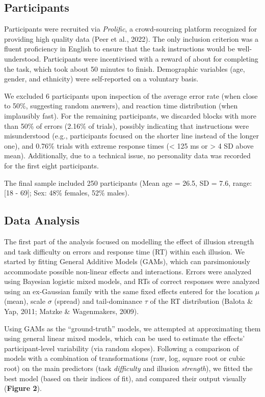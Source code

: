\documentclass[
  man,floatsintext]{apa6}
\begin{document}
\hypertarget{participants}{%
\subsection{Participants}\label{participants}}

Participants were recruited via \emph{Prolific}, a crowd-sourcing platform recognized for providing high quality data (Peer et al., 2022). The only inclusion criterion was a fluent proficiency in English to ensure that the task instructions would be well-understood. Participants were incentivised with a reward of about  for completing the task, which took about 50 minutes to finish. Demographic variables (age, gender, and ethnicity) were self-reported on a voluntary basis.

We excluded 6 participants upon inspection of the average error rate (when close to 50\%, suggesting random answers), and reaction time distribution (when implausibly fast). For the remaining participants, we discarded blocks with more than 50\% of errors (2.16\% of trials), possibly indicating that instructions were misunderstood (e.g., participants focused on the shorter line instead of the longer one), and 0.76\% trials with extreme response times (\textless{} 125 ms or \textgreater{} 4 SD above mean). Additionally, due to a technical issue, no personality data was recorded for the first eight participants.

The final sample included 250 participants (Mean age = 26.5, SD = 7.6, range: {[}18 - 69{]}; Sex: 48\% females, 52\% males).

\hypertarget{data-analysis}{%
\subsection{Data Analysis}\label{data-analysis}}

The first part of the analysis focused on modelling the effect of illusion strength and task difficulty on errors and response time (RT) within each illusion. We started by fitting General Additive Models (GAMs), which can parsimoniously accommodate possible non-linear effects and interactions. Errors were analyzed using Bayesian logistic mixed models, and RTs of correct responses were analyzed using an ex-Gaussian family with the same fixed effects entered for the location \(\mu\) (mean), scale \(\sigma\) (spread) and tail-dominance \(\tau\) of the RT distribution (Balota \& Yap, 2011; Matzke \& Wagenmakers, 2009).

Using GAMs as the ``ground-truth'' models, we attempted at approximating them using general linear mixed models, which can be used to estimate the effects' participant-level variability (via random slopes). Following a comparison of models with a combination of transformations (raw, log, square root or cubic root) on the main predictors (task \emph{difficulty} and illusion \emph{strength}), we fitted the best model (based on their indices of fit), and compared their output visually (\textbf{Figure 2}).
\end{document}
